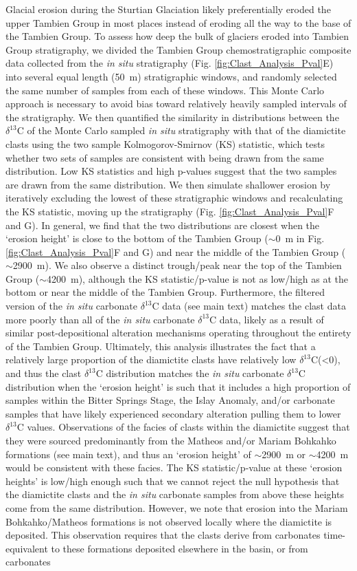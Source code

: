 \documentclass[11pt,letterpaper]{article}
\newcommand{\dC}{$\delta^{13}$C\xspace}
\newcommand{\permil}{\textperthousand\xspace}
\begin{document}
Glacial erosion during the Sturtian Glaciation likely preferentially eroded the upper Tambien Group in most places instead of eroding all the way to the base of the Tambien Group. To assess how deep the bulk of glaciers eroded into Tambien Group stratigraphy, we divided the Tambien Group chemostratigraphic composite data collected from the \textit{in situ} stratigraphy (Fig. \ref{fig:Clast_Analysis_Pval}E) into several equal length (50~m) stratigraphic windows, and randomly selected the same number of samples from each of these windows. This Monte Carlo approach is necessary to avoid bias toward relatively heavily sampled intervals of the stratigraphy. We then quantified the similarity in distributions between the \dC of the Monte Carlo sampled \textit{in situ} stratigraphy with that of the diamictite clasts using the two sample Kolmogorov-Smirnov (KS) statistic, which tests whether two sets of samples are consistent with being drawn from the same distribution. Low KS statistics and high p-values suggest that the two samples are drawn from the same distribution. We then simulate shallower erosion by iteratively excluding the lowest of these stratigraphic windows and recalculating the KS statistic, moving up the stratigraphy (Fig. \ref{fig:Clast_Analysis_Pval}F and G). In general, we find that the two distributions are closest when the `erosion height' is close to the bottom of the Tambien Group ($\sim$0~m in Fig. \ref{fig:Clast_Analysis_Pval}F and G) and near the middle of the Tambien Group ($\sim$2900~m). We also observe a distinct trough/peak near the top of the Tambien Group ($\sim$4200~m), although the KS statistic/p-value is not as low/high as at the bottom or near the middle of the Tambien Group. Furthermore, the filtered version of the \textit{in situ} carbonate \dC data (see main text) matches the clast data more poorly than all of the \textit{in situ} carbonate \dC data, likely as a result of similar post-depositional alteration mechanisms operating throughout the entirety of the Tambien Group. Ultimately, this analysis illustrates the fact that a relatively large proportion of the diamictite clasts have relatively low \dC (\textless0\permil), and thus the clast \dC distribution matches the \textit{in situ} carbonate \dC distribution when the `erosion height' is such that it includes a high proportion of samples within the Bitter Springs Stage, the Islay Anomaly, and/or carbonate samples that have likely experienced secondary alteration pulling them to lower \dC values. Observations of the facies of clasts within the diamictite suggest that they were sourced predominantly from the Matheos and/or Mariam Bohkahko formations (see main text), and thus an `erosion height' of $\sim$2900~m or $\sim$4200~m would be consistent with these facies. The KS statistic/p-value at these `erosion heights' is low/high enough such that we cannot reject the null hypothesis that the diamictite clasts and the \textit{in situ} carbonate samples from above these heights come from the same distribution. However, we note that erosion into the Mariam Bohkahko/Matheos formations is not observed locally where the diamictite is deposited. This observation requires that the clasts derive from carbonates time-equivalent to these formations deposited elsewhere in the basin, or from carbonates 
\end{document}
